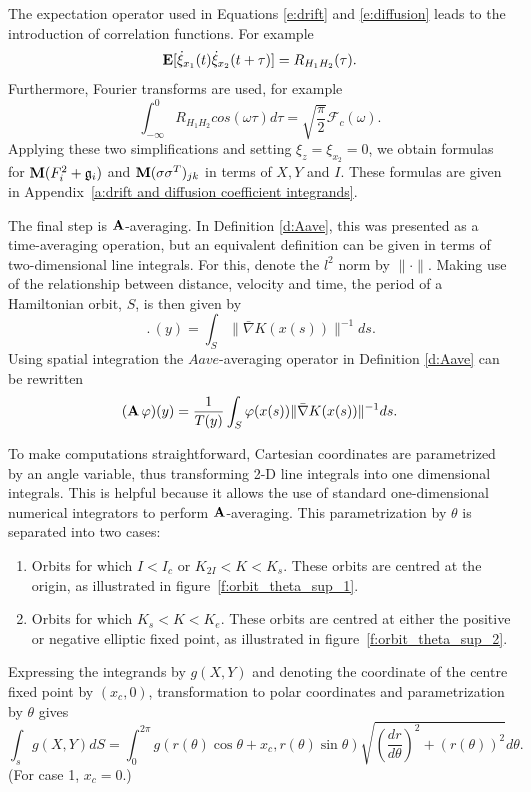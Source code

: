 The expectation operator used in Equations \eqref{e:drift} and \eqref{e:diffusion} leads to the introduction of correlation functions. For example
\begin{equation}
\operatorname{\mathbf E}[\dot{\xi}_{x_1}(t) \dot{\xi}_{x_2}(t+\tau)] = R_{H_1 H_2}(\tau).
\end{equation}
Furthermore, Fourier transforms are used, for example
\begin{equation}
\int_{-\infty}^0 R_{H_1 H_2} cos(\omega \tau) d \tau =
\sqrt{\frac{\pi}{2}} \mathcal{F}_c(\omega).
\end{equation}
Applying these two simplifications and setting $\xi_z = \xi_{x_2} = 0$, we obtain formulas for $\operatorname{\mathbf M}(F_i^2 + \mathfrak{g}_i)$ and $\operatorname{\mathbf M}(\sigma \sigma^T)_{jk}$ in terms of $X, Y$ and $I$. These formulas are given in Appendix~\ref{a:drift and diffusion coefficient integrands}.

The final step is $\operatorname{\mathbf A}$-averaging. In Definition \ref{d:Aave}, this was presented as a time-averaging operation, but an equivalent definition can be given in terms of two-dimensional line integrals. For this, denote the $l^2$ norm by $\lVert\cdot\rVert$. Making use of the relationship between distance, velocity and time, the period of a Hamiltonian orbit, $S$, is then given by
\[
\period(y) = \int_S \lVert \bar \nabla K(x(s)) \rVert^{-1} ds.
\]
Using spatial integration the $Aave$-averaging operator in Definition \ref{d:Aave} can be rewritten
\[
(\operatorname{\mathbf A} \varphi) (y) = \frac{1}{T(y)} \int_S \varphi(x(s)) \lVert \bar \nabla K(x(s)) \rVert^{-1} ds.
\]

To make computations straightforward, Cartesian coordinates are parametrized by an angle variable, thus transforming 2-D line integrals into one dimensional integrals. This is helpful because it allows the use of standard one-dimensional numerical integrators to perform $\operatorname{\mathbf A}$-averaging. This parametrization by $\theta$ is separated into two cases:
\begin{enumerate}
\item Orbits for which $I < I_c$ or $K_{2I} < K < K_s$. These orbits are centred at the origin, as illustrated in figure~\ref{f:orbit_theta_sup_1}.
\item Orbits for which $K_{s} < K < K_e$. These orbits are centred at either the positive or negative elliptic fixed point, as illustrated in figure~\ref{f:orbit_theta_sup_2}.
\end{enumerate}

Expressing the integrands by $g(X,Y)$ and denoting the coordinate of the centre fixed point by $(x_c,0)$, transformation to polar coordinates and parametrization by $\theta$ gives
\begin{equation}
\label{e:polar integral}
\int_s g(X,Y) dS = \int_0^{2\pi} g(r(\theta) \cos \theta + x_c, r(\theta) \sin \theta) \sqrt{\left(\frac{dr}{d\theta}\right)^2 + (r(\theta))^2} d\theta.
\end{equation}
(For case 1, $x_c = 0$.)

